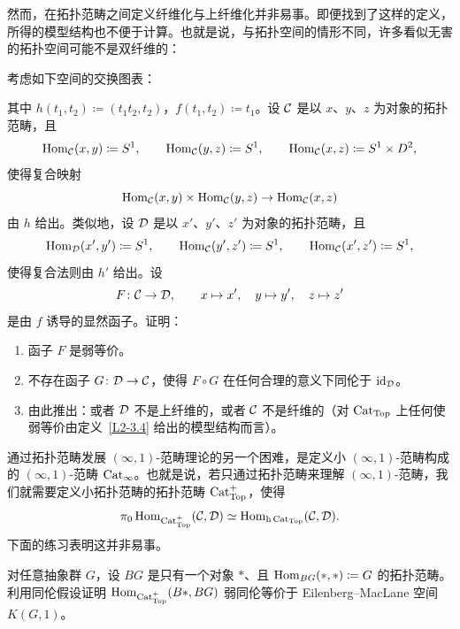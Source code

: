 \nitem\label{L2-3.5} 然而，在拓扑范畴之间定义纤维化与上纤维化并非易事。即便找到了这样的定义，所得的模型结构也不便于计算。也就是说，与拓扑空间的情形不同，许多看似无害的拓扑空间可能不是双纤维的：

\begin{exercise}\label{L2-3.6}
考虑如下空间的交换图表：
\begin{center}
\end{center}
其中 $h(t_1,t_2)\coloneqq(t_1t_2,t_2)$，$f(t_1,t_2)\coloneqq t_1$。设 $\mathcal{C}$ 是以 $x$、$y$、$z$ 为对象的拓扑范畴，且
\[
\operatorname{Hom}_{\mathcal{C}}(x,y)\coloneqq S^1,\qquad
\operatorname{Hom}_{\mathcal{C}}(y,z)\coloneqq S^1,\qquad
\operatorname{Hom}_{\mathcal{C}}(x,z)\coloneqq S^1\times D^2,
\]
使得复合映射
\[
\operatorname{Hom}_{\mathcal{C}}(x,y)\times\operatorname{Hom}_{\mathcal{C}}(y,z)\to\operatorname{Hom}_{\mathcal{C}}(x,z)
\]
由 $h$ 给出。类似地，设 $\mathcal{D}$ 是以 $x'$、$y'$、$z'$ 为对象的拓扑范畴，且
\[
\operatorname{Hom}_{\mathcal{D}}(x',y')\coloneqq S^1,\qquad
\operatorname{Hom}_{\mathcal{C}}(y',z')\coloneqq S^1,\qquad
\operatorname{Hom}_{\mathcal{C}}(x',z')\coloneqq S^1,
\]
使得复合法则由 $h'$ 给出。设
\[
F\colon\mathcal{C}\to\mathcal{D},\qquad x\mapsto x',\quad y\mapsto y',\quad z\mapsto z'
\]
是由 $f$ 诱导的显然函子。证明：
\begin{enumerate}[label=(\arabic*),leftmargin=2.4em,itemsep=0.1em]
\item 函子 $F$ 是弱等价。
\item 不存在函子 $G\colon\mathcal{D}\to\mathcal{C}$，使得 $F\circ G$ 在任何合理的意义下同伦于 $\operatorname{id}_{\mathcal{D}}$。
\item 由此推出：或者 $\mathcal{D}$ 不是上纤维的，或者 $\mathcal{C}$ 不是纤维的（对 $\operatorname{Cat}_{\operatorname{Top}}$ 上任何使弱等价由定义~\ref{L2-3.4} 给出的模型结构而言）。
\end{enumerate}
\end{exercise}


\nitem\label{L2-3.7} 通过拓扑范畴发展 $(\infty,1)$-范畴理论的另一个困难，是定义小 $(\infty,1)$-范畴构成的 $(\infty,1)$-范畴 $\operatorname{Cat}_{\infty}$。也就是说，若只通过拓扑范畴来理解 $(\infty,1)$-范畴，我们就需要定义小拓扑范畴的拓扑范畴 $\operatorname{Cat}^{+}_{\operatorname{Top}}$，使得
\[
\pi_0\operatorname{Hom}_{\operatorname{Cat}^{+}_{\operatorname{Top}}}(\mathcal{C},\mathcal{D})\simeq\operatorname{Hom}_{\mathrm{h}\operatorname{Cat}_{\operatorname{Top}}}(\mathcal{C},\mathcal{D}).
\]
下面的练习表明这并非易事。

\begin{exercise}\label{L2-3.8}
对任意抽象群 $G$，设 $BG$ 是只有一个对象 $\ast$、且 $\operatorname{Hom}_{BG}(\ast,\ast)\coloneqq G$ 的拓扑范畴。利用同伦假设证明 $\operatorname{Hom}_{\operatorname{Cat}^{+}_{\operatorname{Top}}}(B\ast,BG)$ 弱同伦等价于 Eilenberg--MacLane 空间 $K(G,1)$。
\end{exercise}

